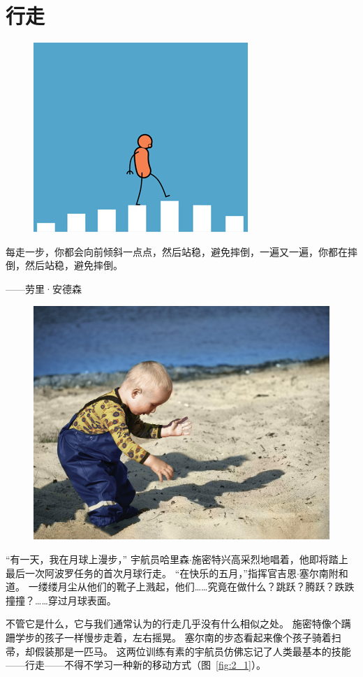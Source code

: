 \chapter{行走} \label{chap:chap2}

\begin{figure}[!htb]
	\centering
	\includegraphics[width=0.5\linewidth]{chap2/2_0}
	\caption*{ \label{fig:2_0}}
\end{figure}

每走一步，你都会向前倾斜一点点，然后站稳，避免摔倒，一遍又一遍，你都在摔倒，然后站稳，避免摔倒。

\begin{flushright}
	——劳里·安德森 \\
\end{flushright}

\begin{figure}[!htb]
	\centering
	\includegraphics[width=0.5\linewidth]{chap2/2_0_2}
	\caption*{ \label{fig:2_0_2}}
\end{figure}

“有一天，我在月球上漫步，”
宇航员哈里森$\cdot$施密特兴高采烈地唱着，他即将踏上最后一次阿波罗任务的首次月球行走。
“在快乐的五月，”指挥官吉恩$\cdot$塞尔南附和道。
一缕缕月尘从他们的靴子上溅起，他们……究竟在做什么？跳跃？腾跃？跌跌撞撞？……穿过月球表面。


不管它是什么，它与我们通常认为的行走几乎没有什么相似之处。
施密特像个蹒跚学步的孩子一样慢步走着，左右摇晃。
塞尔南的步态看起来像个孩子骑着扫帚，却假装那是一匹马。
这两位训练有素的宇航员仿佛忘记了人类最基本的技能——行走——不得不学习一种新的移动方式（图~\ref{fig:2_1}）。


